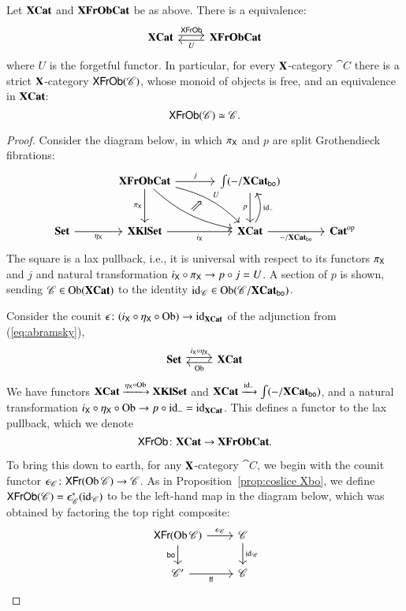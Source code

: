 \documentclass[12pt,oneside,article,draft]{memoir}
\begin{document}
\begin{enumerate}
\begin{proposition}\label{prop:free objects}
	Let $\mathbf{XCat}$ and $\mathbf{XFrObCat}$ be as above.
	There is a equivalence:
	$$
	\begin{tikzcd}
		\XCat\arrow[r, shift left=.5ex, "\Fun{XFrOb}"]&\Cat{XFrObCat}\arrow[l, shift left=.5ex,"U"]
	\end{tikzcd}
	$$
	where $U$ is the forgetful functor.
	In particular, for every $\mathbf{X}$-category $\cat{C}$ there is a strict $\mathbf{X}$-category $\mathsf{XFrOb}(\mathscr{C})$, whose monoid of objects is free, and an equivalence in $\mathbf{XCat}$:
		$$\mathsf{XFrOb}(\mathscr{C})\simeq\mathscr{C}.$$
\end{proposition}
\begin{proof}
	Consider the diagram below, in which $\pi_{\mathsf{X}}$ and $p$ are split Grothendieck fibrations:
	$$
	\begin{tikzcd}[row sep=large,column sep=large]
		&\Cat{XFrObCat}\ar[r,"j"]\ar[d,"\pi_{\Fun{X}}"']\ar[dr,bend left=15pt,"U"]\ar[dr,bend right=15pt]\ar[dr,phantom,"\Nearrow"]
			&\int(-/\XCat_{\bo})\ar[d,"p"'] \\
		\Set\ar[r,"\eta_{\Fun{X}}"']&\Cat{XKlSet}\ar[r,"i_{\Fun{X}}"']
			&\XCat\ar[u,bend right,"\id_{-}"']\ar[r,"-/\XCat_{\bo}"']&\op{\Cat{Cat}}
	\end{tikzcd}
	$$
	The square is a lax pullback, i.e., it is universal with respect to its functors $\pi_{\mathsf{X}}$ and $j$ and natural transformation $i_{\mathsf{X}}\circ\pi_{\mathsf{X}}\to p\circ j=U$.
	A section of $p$ is shown, sending $\mathscr{C}\in\operatorname{Ob}(\mathbf{XCat})$ to the identity $\operatorname{id}_{\mathscr{C}}\in\operatorname{Ob}(\mathscr{C}/\mathbf{XCat}_{\mathsf{bo}})$. 

	Consider the counit $\epsilon\colon (i_{\mathsf{X}}\circ\eta_{\mathsf{X}}\circ\operatorname{Ob})\to\operatorname{id}_{\mathbf{XCat}}$ of the adjunction from (\ref{eq:abramsky}),
	$$
	\begin{tikzcd}
		\Cat{Set}\arrow[r, shift left=.5ex, "i_{\Fun{X}}\circ\eta_{\Fun{X}}"]&\XCat\arrow[l, shift left=.5ex,"\Ob"]
	\end{tikzcd}
	$$
	We have functors $\mathbf{XCat}\xrightarrow{\eta_{\mathsf{X}}\circ\operatorname{Ob}}\mathbf{XKlSet}$ and $\mathbf{XCat}\xrightarrow{\operatorname{id}_{-}}\int(-/\mathbf{XCat}_{\mathsf{bo}})$, and a natural transformation $i_{\mathsf{X}}\circ\eta_{\mathsf{X}}\circ\operatorname{Ob}\to p\circ\operatorname{id}_{-}=\operatorname{id}_{\mathbf{XCat}}$.
	This defines a functor to the lax pullback, which we denote
		$$\mathsf{XFrOb}\colon\mathbf{XCat}\to\mathbf{XFrObCat}.$$

	To bring this down to earth, for any $\mathbf{X}$-category $\cat{C}$, we begin with the counit functor $\epsilon_{\mathscr{C}}\colon\mathsf{XFr}(\operatorname{Ob}\mathscr{C})\to\mathscr{C}$.
	As in Proposition~\ref{prop:coslice Xbo}, we define $\mathsf{XFrOb}(\mathscr{C})=\epsilon_{\mathscr{C}}^*(\operatorname{id}_{\mathscr{C}})$ to be the left-hand map in the diagram below, which was obtained by factoring the top right composite:
	$$
	\begin{tikzcd}
		\Fun{XFr}(\Ob\cat{C})\arrow[d, "\bo"']\arrow[r, "\epsilon_{\cat{C}}"]&\cat{C}\ar[d,"\id_{\cat{C}}"]\\
		\cat{C'}\arrow[r, "\ff"']&\cat{C}
	\end{tikzcd}
	$$


\end{proof}
\end{enumerate}
\end{document}
